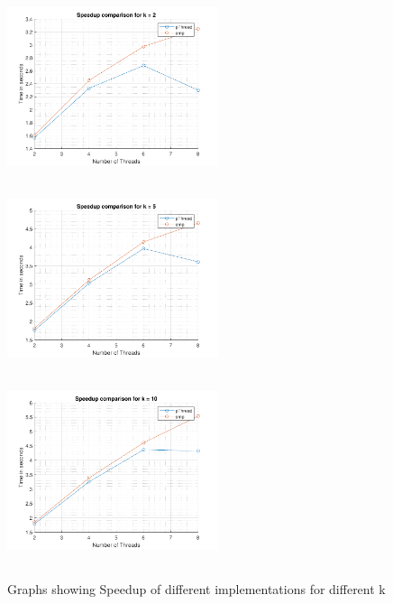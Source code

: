 \documentclass[letter, 11pt, margin=1in]{article}
\begin{document}
\begin{figure}[H]
    \includegraphics[width=6.2cm,height=5.5cm]{tsk2}
    \includegraphics[width=6.2cm,height=5.5cm]{tsk5}
    \includegraphics[width=6.2cm,height=5.5cm]{tsk10}
    \caption{Graphs showing Speedup of different implementations for different k}
    \label{fig:speedup}
\end{figure}
\end{document}
